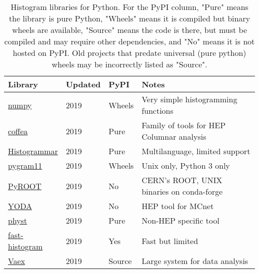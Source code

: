 \documentclass{webofc}
\begin{document}
\begin{table}[h]
	\centering
	\caption{Histogram libraries for Python. For the PyPI column, "Pure" means the library is pure Python, "Wheels" means it is compiled but binary wheels are available, "Source" means the code is there, but must be compiled and may require other dependencies, and "No" means it is not hosted on PyPI. Old projects that predate universal (pure python) wheels may be incorrectly listed as "Source".}
	\label{tab-libraries}       %
	\small
	\begin{tabular}{llll}
		\hline
		Library                                                                      & Updated & PyPI   & Notes                                                \\ \hline
		\href{https://www.numpy.org/}{numpy}                                         & 2019         & Wheels & Very simple histogramming functions                  \\
		\href{https://coffeateam.github.io/coffea/notebooks/histograms.html}{coffea} & 2019         & Pure   & Family of tools for HEP Columnar analysis            \\
		\href{https://histogrammar.org}{Histogrammar}                                & 2019         & Pure   & Multilanguage, limited support                       \\
		\href{https://pygram11.readthedocs.io}{pygram11}                             & 2019         & Wheels & Unix only, Python 3 only                             \\
		\href{https://root.cern.ch/pyroot}{PyROOT}                                   & 2019         & No     & CERN's ROOT, UNIX binaries on conda-forge            \\
		\href{https://yoda.hepforge.org}{YODA}                                       & 2019         & No     & HEP tool for MCnet                                   \\
		\href{https://physt.readthedocs.io/en/latest/tutorial.html}{physt}           & 2019         & Pure   & Non-HEP specific tool                                \\
		\href{https://github.com/astrofrog/fast-histogram}{fast-histogram}           & 2019         & Yes    & Fast but limited                                     \\
		\href{https://vaex.io}{Vaex}                                                 & 2019         & Source & Large system for data analysis                       \\

\end{tabular}
\end{table}
\end{document}
